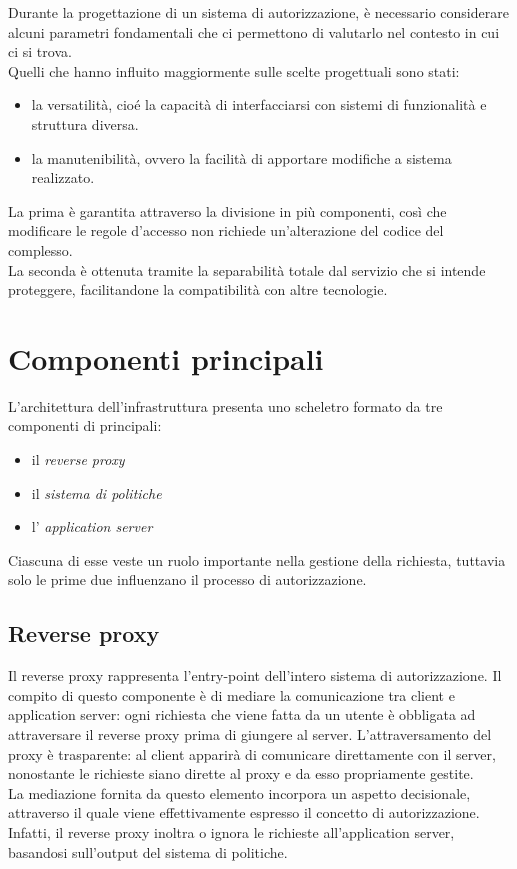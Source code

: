 Durante la progettazione di un sistema di autorizzazione, è necessario considerare alcuni parametri fondamentali che ci permettono di valutarlo 
nel contesto in cui ci si trova.
\\ Quelli che hanno influito maggiormente sulle scelte progettuali sono stati:
\begin{itemize}
    \item la versatilità, cioé la capacità di interfacciarsi con sistemi di 
    funzionalità e struttura diversa.
    \item la manutenibilità, ovvero la facilità di apportare modifiche a sistema realizzato.
\end{itemize}
La prima è garantita attraverso la divisione in più componenti, così che modificare le regole d'accesso non richiede 
un'alterazione del codice del complesso. 
\\ La seconda è ottenuta tramite la separabilità totale dal servizio che si intende proteggere,
 facilitandone la compatibilità con altre tecnologie.   

\section{Componenti principali}

L'architettura dell'infrastruttura presenta uno scheletro formato da tre componenti di principali: 
\begin{itemize}
    \item il \textit{reverse proxy}
    \item il \textit{sistema di politiche}
    \item l' \textit{application server}
\end{itemize}
Ciascuna di esse veste un ruolo importante nella gestione della richiesta, tuttavia solo le prime due influenzano il processo di autorizzazione. 

\subsection{Reverse proxy}
Il reverse proxy rappresenta l'entry-point dell'intero sistema di autorizzazione. Il compito di questo componente è di
mediare la comunicazione tra client e application server: ogni richiesta che viene fatta da un utente è obbligata ad attraversare 
il reverse proxy prima di giungere al server. 
L'attraversamento del proxy è trasparente: al client apparirà di comunicare direttamente con il server, nonostante le richieste siano dirette al proxy e da esso propriamente gestite. 
\\ La mediazione fornita da questo elemento incorpora un aspetto decisionale, attraverso il quale viene effettivamente espresso il concetto di autorizzazione. 
Infatti, il reverse proxy inoltra o ignora le richieste all'application server, basandosi sull'output del sistema di politiche.  
 
